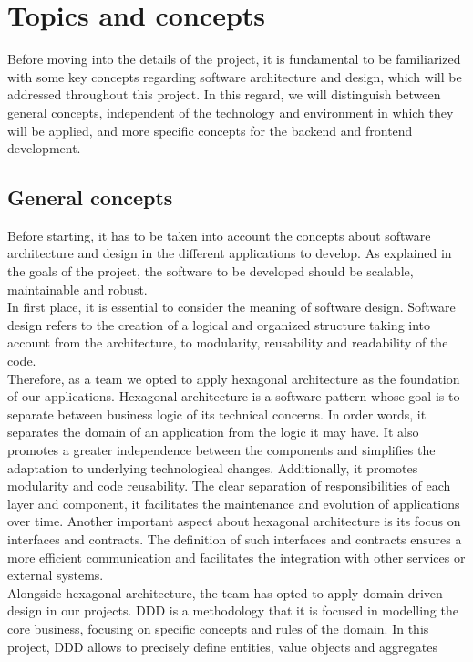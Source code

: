 \documentclass[../memory.tex]{subfiles}
\begin{document}
\section{Topics and concepts}
Before moving into the details of the project, it is fundamental to be
familiarized with some key concepts regarding software architecture and design,
which will be addressed throughout this project. In this regard, we will
distinguish between general concepts, independent of the technology and
environment in which they will be applied, and more specific concepts for the
backend and frontend development.
\subsection{General concepts}
Before starting, it has to be taken into account the concepts about software
architecture and design in the different applications to develop. As explained
in the goals of the project, the software to be developed should be scalable,
maintainable and robust.
\\[8pt]
In first place, it is essential to consider the meaning of software design.
Software design refers to the creation of a logical and organized structure
taking into account from the architecture, to modularity, reusability and
readability of the code.
\\[8pt]
Therefore, as a team we opted to apply hexagonal architecture as the foundation
of our applications. Hexagonal architecture is a software pattern whose goal is
to separate between business logic of its technical concerns. In order words, it
separates the domain of an application from the logic it may have. It also
promotes a greater independence between the components and simplifies the
adaptation to underlying technological changes. Additionally, it promotes
modularity and code reusability. The clear separation of responsibilities of
each layer and component, it facilitates the maintenance and evolution of
applications over time. Another important aspect about hexagonal architecture is
its focus on interfaces and contracts. The definition of such interfaces and
contracts ensures a more efficient communication and facilitates the
integration with other services or external systems.
\\
Alongside hexagonal architecture, the team has opted to apply domain driven
design in our projects. DDD is a methodology that it is focused in modelling the
core business, focusing on specific concepts and rules of the domain. In this
project, DDD allows to precisely define entities, value objects and aggregates
\end{document}
